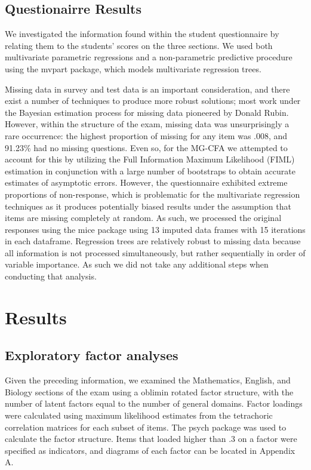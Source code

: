 \documentclass{article}\usepackage[]{graphicx}\usepackage[]{color}
\begin{document}
\subsection{Questionairre Results}

We investigated the information found within the student questionnaire by relating them to the students' scores on the three sections. We used both multivariate parametric regressions and a non-parametric predictive procedure using the mvpart package, which models multivariate regression trees.


Missing data in survey and test data is an important consideration, and there exist a number of techniques to produce more robust solutions; most work under the Bayesian estimation process for missing data pioneered by Donald Rubin\cite{rubin}. However, within the structure of the exam, missing data was unsurprisingly a rare occurrence: the highest proportion of missing for any item was .008, and 91.23\% had no missing questions. Even so, for the MG-CFA we attempted to account for this by utilizing the Full Information Maximum Likelihood (FIML) estimation in conjunction with a large number of bootstraps to obtain accurate estimates of asymptotic errors. However, the questionnaire exhibited extreme proportions of non-response, which is problematic for the multivariate regression techniques as it produces potentially biased results under the assumption that items are missing completely at random. As such, we processed the original responses using the mice package\cite{mice} using 13 imputed data frames with 15 iterations in each dataframe. Regression trees are relatively robust to missing data because all information is not processed simultaneously, but rather sequentially in order of variable importance. As such we did not take any additional steps when conducting that analysis.

\section{Results}
\subsection{Exploratory factor analyses}
Given the preceding information, we examined the Mathematics, English, and Biology sections of the exam using a oblimin rotated factor structure, with the number of latent factors equal to the number of general domains. Factor loadings were calculated using maximum likelihood estimates from the tetrachoric correlation matrices for each subset of items. The psych package was used to calculate the factor structure. Items that loaded higher than .3 on a factor were specified as indicators, and diagrams of each factor can be located in Appendix A.
\end{document}
